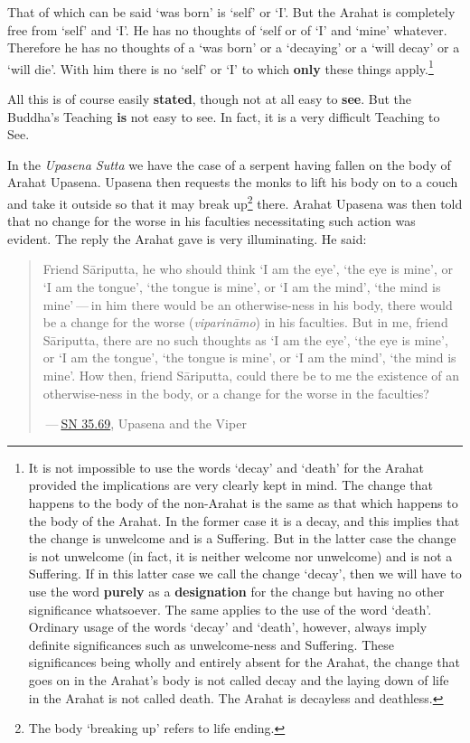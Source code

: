 That of which can be said `was born' is `self' or `I'. But the Arahat is completely free from `self' and `I'. He has no thoughts of `self or of `I' and `mine' whatever. Therefore he has no thoughts of a `was born' or a `decaying' or a `will decay' or a `will die'. With him there is no `self' or `I' to which \textbf{only} these things apply.\footnote{It is not impossible to use the words `decay' and `death' for the Arahat provided the implications are very clearly kept in mind. The change that happens to the body of the non-Arahat is the same as that which happens to the body of the Arahat. In the former case it is a decay, and this implies that the change is unwelcome and is a Suffering. But in the latter case the change is not unwelcome (in fact, it is neither welcome nor unwelcome) and is not a Suffering. If in this latter case we call the change `decay', then we will have to use the word \textbf{purely} as a \textbf{designation} for the change but having no other significance whatsoever. The same applies to the use of the word `death'. Ordinary usage of the words `decay' and `death', however, always imply definite significances such as unwelcome-ness and Suffering. These significances being wholly and entirely absent for the Arahat, the change that goes on in the Arahat's body is not called decay and the laying down of life in the Arahat is not called death. The Arahat is decayless and deathless.}

All this is of course easily \textbf{stated}, though not at all easy to \textbf{see}. But the Buddha's Teaching \textbf{is} not easy to see. In fact, it is a very difficult Teaching to See.

In the \emph{Upasena Sutta} we have the case of a serpent having fallen on the body of Arahat Upasena. Upasena then requests the monks to lift his body on to a couch and take it outside so that it may break up\footnote{The body `breaking up' refers to life ending.} there. Arahat Upasena was then told that no change for the worse in his faculties necessitating such action was evident. The reply the Arahat gave is very illuminating. He said:

\begin{quote}
Friend Sāriputta, he who should think `I am the eye', `the eye is mine', or `I am the tongue', `the tongue is mine', or `I am the mind', `the mind is mine' --- in him there would be an otherwise-ness in his body, there would be a change for the worse (\emph{viparināmo}) in his faculties. But in me, friend Sāriputta, there are no such thoughts as `I am the eye', `the eye is mine', or `I am the tongue', `the tongue is mine', or `I am the mind', `the mind is mine'. How then, friend Sāriputta, could there be to me the existence of an otherwise-ness in the body, or a change for the worse in the faculties?

 --- \href{https://suttacentral.net/sn35.69/en/sujato}{SN 35.69}, Upasena and the Viper
\end{quote}

